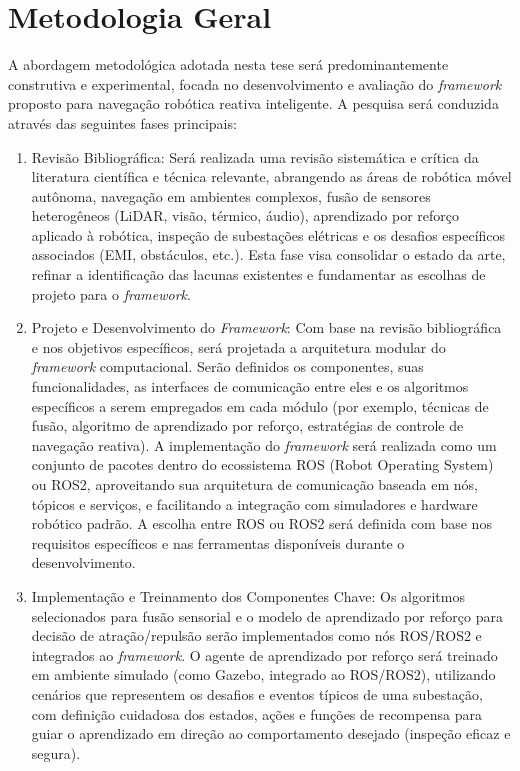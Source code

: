 \section{Metodologia Geral}
A abordagem metodológica adotada nesta tese será predominantemente construtiva e experimental, focada no desenvolvimento e avaliação do \textit{framework} proposto para navegação robótica reativa inteligente. A pesquisa será conduzida através das seguintes fases principais:
\begin{enumerate}
    \item Revisão Bibliográfica: Será realizada uma revisão sistemática e crítica da literatura científica e técnica relevante, abrangendo as áreas de robótica móvel autônoma, navegação em ambientes complexos, fusão de sensores heterogêneos (\ac{LiDAR}, visão, térmico, áudio), aprendizado por reforço aplicado à robótica, inspeção de subestações elétricas e os desafios específicos associados (EMI, obstáculos, etc.). Esta fase visa consolidar o estado da arte, refinar a identificação das lacunas existentes e fundamentar as escolhas de projeto para o \textit{framework}.
    \item Projeto e Desenvolvimento do \textit{Framework}: Com base na revisão bibliográfica e nos objetivos específicos, será projetada a arquitetura modular do \textit{framework} computacional. Serão definidos os componentes, suas funcionalidades, as interfaces de comunicação entre eles e os algoritmos específicos a serem empregados em cada módulo (por exemplo, técnicas de fusão, algoritmo de aprendizado por reforço, estratégias de controle de navegação reativa). A implementação do \textit{framework} será realizada como um conjunto de pacotes dentro do ecossistema \ac{ROS} (Robot Operating System) ou ROS2, aproveitando sua arquitetura de comunicação baseada em nós, tópicos e serviços, e facilitando a integração com simuladores e hardware robótico padrão. A escolha entre \ac{ROS} ou ROS2 será definida com base nos requisitos específicos e nas ferramentas disponíveis durante o desenvolvimento.
    \item Implementação e Treinamento dos Componentes Chave: Os algoritmos selecionados para fusão sensorial e o modelo de aprendizado por reforço para decisão de atração/repulsão serão implementados como nós ROS/ROS2 e integrados ao \textit{framework}. O agente de aprendizado por reforço será treinado em ambiente simulado (como Gazebo, integrado ao ROS/ROS2), utilizando cenários que representem os desafios e eventos típicos de uma subestação, com definição cuidadosa dos estados, ações e funções de recompensa para guiar o aprendizado em direção ao comportamento desejado (inspeção eficaz e segura).

\end{enumerate}
